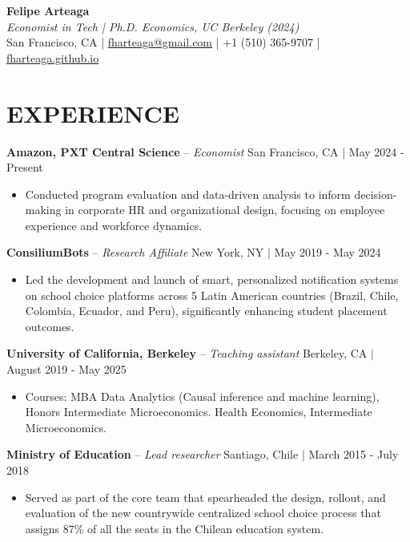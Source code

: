 \documentclass[letter,9pt]{extarticle}
\begin{document}
\pagestyle{empty}



\begin{center}
{\Large \textbf{Felipe Arteaga}}\\[2pt]
\textit{Economist in Tech | Ph.D. Economics, UC Berkeley (2024)}\\[3pt]
San Francisco, CA | \href{mailto:fharteaga@gmail.com}{fharteaga@gmail.com} | +1 (510) 365-9707 | \href{https://fharteaga.github.io/}{fharteaga.github.io}
\end{center}

\section*{EXPERIENCE}
\noindent
\textbf{Amazon, PXT Central Science} -- \textit{Economist}  \hfill San Francisco, CA $|$ May 2024 - Present %
\begin{itemize}
    \item Conducted program evaluation and data-driven analysis to inform decision-making in corporate HR and organizational design, focusing on employee experience and workforce dynamics. %
\end{itemize}
\noindent
\textbf{ConsiliumBots} -- \textit{Research Affiliate}  \hfill New York, NY $|$ May 2019 - May 2024 %
\begin{itemize}
    \item Led the development and launch of smart, personalized notification systems on school choice platforms across 5 Latin American countries (Brazil, Chile, Colombia, Ecuador, and Peru), significantly enhancing student placement outcomes.  %
\end{itemize}
\noindent
\textbf{University of California, Berkeley} -- \textit{Teaching assistant} \hfill Berkeley, CA $|$ August 2019 - May 2025
\begin{itemize}
    \item Courses: MBA Data Analytics (Causal inference and machine learning), Honors Intermediate Microeconomics. Health Economics, Intermediate Microeconomics.  %
\end{itemize}
\noindent
\textbf{Ministry of Education} -- \textit{Lead researcher}  \hfill Santiago, Chile $|$ March 2015 - July 2018 %
\begin{itemize}
    \item Served as part of the core team that spearheaded the design, rollout, and evaluation of the new countrywide centralized school choice process that assigns 87\% of all the seats in the Chilean education system. %
\end{itemize}
\end{document}
